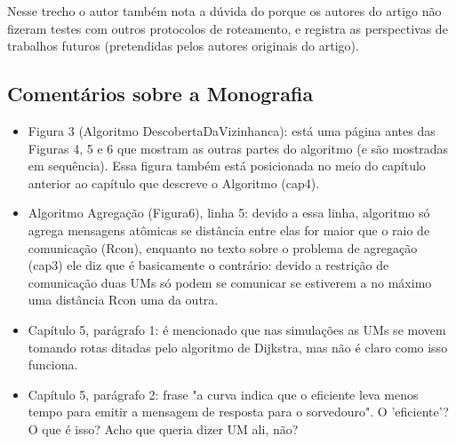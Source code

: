 \documentclass[a4paper,11pt]{article}
\begin{document}
Nesse trecho o autor também nota a dúvida do porque os autores do artigo não fizeram testes
com outros protocolos de roteamento, e registra as perspectivas de trabalhos futuros (pretendidas
pelos autores originais do artigo).

\subsection{Comentários sobre a Monografia}
\begin{itemize}
  \item Figura 3 (Algoritmo DescobertaDaVizinhanca): está uma página antes das Figuras 4, 5 e 6
que mostram as outras partes do algoritmo (e são mostradas em sequência). Essa figura
também está posicionada no meio do capítulo anterior ao capítulo que descreve o Algoritmo (cap4).

  \item Algoritmo Agregação (Figura6), linha 5: devido a essa linha, algoritmo só agrega mensagens
atômicas se distância entre elas for maior que o raio de comunicação (Rcon), enquanto no texto
sobre o problema de agregação (cap3) ele diz que é basicamente o contrário: devido a restrição de 
comunicação duas UMs só podem se comunicar se estiverem a no máximo uma distância Rcon uma da outra.

  \item Capítulo 5, parágrafo 1: é mencionado que nas simulações as UMs se movem tomando rotas ditadas
pelo algoritmo de Dijkstra, mas não é claro como isso funciona.

  \item Capítulo 5, parágrafo 2: frase "a curva indica que o eficiente leva menos tempo para emitir a
mensagem de resposta para o sorvedouro". O 'eficiente'? O que é isso? Acho que queria dizer UM ali, não?
\end{itemize}
\end{document}
